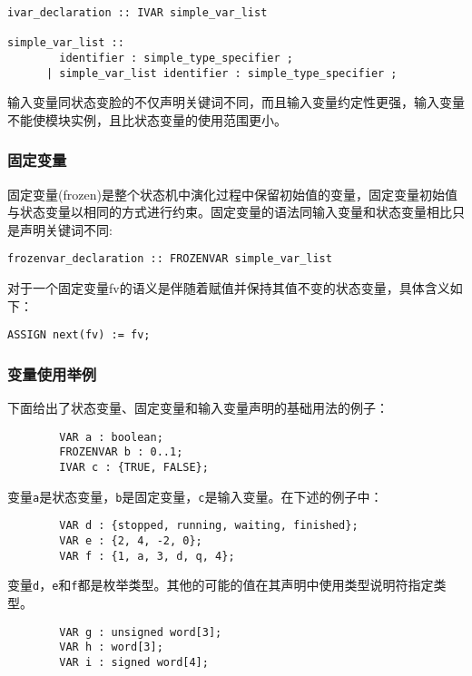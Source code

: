 \begin{lstlisting}
ivar_declaration :: IVAR simple_var_list

simple_var_list ::
        identifier : simple_type_specifier ;
      | simple_var_list identifier : simple_type_specifier ;
\end{lstlisting}

输入变量同状态变脸的不仅声明关键词不同，而且输入变量约定性更强，输入变量不能使模块实例，且比状态变量的使用范围更小。

\subsubsection{固定变量}
固定变量(frozen)是整个状态机中演化过程中保留初始值的变量，固定变量初始值与状态变量以相同的方式进行约束。固定变量的语法同输入变量和状态变量相比只是声明关键词不同:

\begin{lstlisting}
frozenvar_declaration :: FROZENVAR simple_var_list
\end{lstlisting}

对于一个固定变量fv的语义是伴随着赋值并保持其值不变的状态变量，具体含义如下：

\begin{lstlisting}
ASSIGN next(fv) := fv;
\end{lstlisting}

\subsubsection{变量使用举例}
下面给出了状态变量、固定变量和输入变量声明的基础用法的例子：

\begin{lstlisting}
        VAR a : boolean;
        FROZENVAR b : 0..1;
        IVAR c : {TRUE, FALSE};
\end{lstlisting}

变量\verb|a|是状态变量，\verb|b|是固定变量，\verb|c|是输入变量。在下述的例子中：

\begin{lstlisting}
        VAR d : {stopped, running, waiting, finished};
        VAR e : {2, 4, -2, 0};
        VAR f : {1, a, 3, d, q, 4};
\end{lstlisting}

变量\verb|d|，\verb|e|和\verb|f|都是枚举类型。其他的可能的值在其声明中使用类型说明符指定类型。

\begin{lstlisting}
        VAR g : unsigned word[3];
        VAR h : word[3];
        VAR i : signed word[4];
\end{lstlisting}

